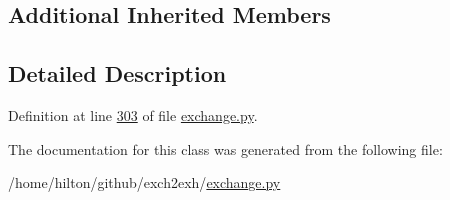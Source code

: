 \subsection*{Additional Inherited Members}


\subsection{Detailed Description}


Definition at line \hyperlink{exchange_8py_source_l00303}{303} of file \hyperlink{exchange_8py_source}{exchange.\+py}.



The documentation for this class was generated from the following file\+:\begin{DoxyCompactItemize}
\item 
/home/hilton/github/exch2exh/\hyperlink{exchange_8py}{exchange.\+py}\end{DoxyCompactItemize}
